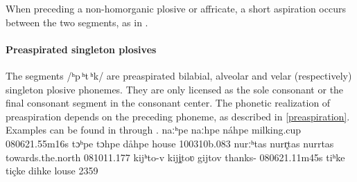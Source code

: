 When preceding a non-homorganic plosive or affricate, a short aspiration occurs between the two segments, as in . 



\paragraph{Preaspirated singleton plosives}
The segments \mbox{/ʰp\,ʰt\,ʰk/} are preaspirated bilabial, alveolar and velar (respectively) singleton plosive phonemes. They are only licensed as the sole consonant or the final consonant segment in the consonant center. 
The phonetic realization of preaspiration depends on the preceding phoneme, as described in \SEC\ref{preaspiration}. 
Examples can be found in  through . 
	{naː{ʰp}e}		{naː{hp}e}	{náhpe}	{milking.cup\BS{}}	{080621}{.55m16s}
		{tɔ{ʰp}e}		{tɔ{hp}e}		{dåhpe}	{house\BS{}}		{100310b}{.083}
		{nurː{ʰt}as}	{nur{r̥t}as}	{nurrtas}	{towards.the.north}		{081011}{.177}
		{kij{ʰt}o-v}		{kij{j̥t}oʋ}		{gijtov}	{thanks-}		{080621}{.11m45s}
		{ti{ʰk}e}		{ti{çk}e}		{dihke}	{louse\BS{}}		{2359}

